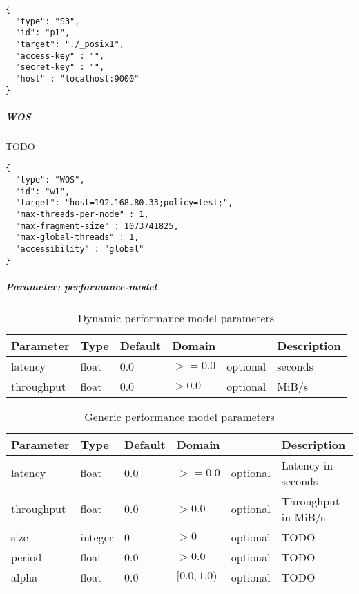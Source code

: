 \begin{lstlisting}
{
  "type": "S3",
  "id": "p1",
  "target": "./_posix1",
  "access-key" : "",
  "secret-key" : "",
  "host" : "localhost:9000"
}
\end{lstlisting}

\subparagraph{WOS}
TODO

\begin{lstlisting}
{
  "type": "WOS",
  "id": "w1",
  "target": "host=192.168.80.33;policy=test;",
  "max-threads-per-node" : 1,
  "max-fragment-size" : 1073741825,
  "max-global-threads" : 1,
  "accessibility" : "global"
}
\end{lstlisting}


\subparagraph{Parameter: performance-model}


\begin{preserve}
\begin{table}[!ht]
  \begin{center}
    \begin{tabularx}{\textwidth}{lllllX}
      Parameter  & Type  & Default & Domain &          & Description \\ 
      \hline
      latency    & float & 0.0     & $>=0.0$  & optional & seconds     \\ 
      throughput & float & 0.0     & $>0.0$   & optional & MiB/s       \\ 
    \end{tabularx}
  \end{center}
  \caption{Dynamic performance model parameters}%
  \label{tab:dyn_perf_model_conf_params}
\end{table}
\end{preserve}


\begin{preserve}
\begin{table}[!ht]
  \begin{center}
    \begin{tabularx}{\textwidth}{lllllX}
      Parameter  & Type    & Default & Domain      &          & Description         \\ 
      \hline
      latency    & float   & 0.0     & $>=0.0$     & optional & Latency in seconds  \\ 
      throughput & float   & 0.0     & $>0.0$      & optional & Throughput in MiB/s \\ 
      size       & integer & 0       & $>0$        & optional & TODO                \\ 
      period     & float   & 0.0     & $>0.0$      & optional & TODO                \\ 
      alpha      & float   & 0.0     & $[0.0,1.0)$ & optional & TODO                \\ 
    \end{tabularx}
  \end{center}
  \caption{Generic performance model parameters}%
  \label{tab:gen_perf_model_conf_params}
\end{table}
\end{preserve}



